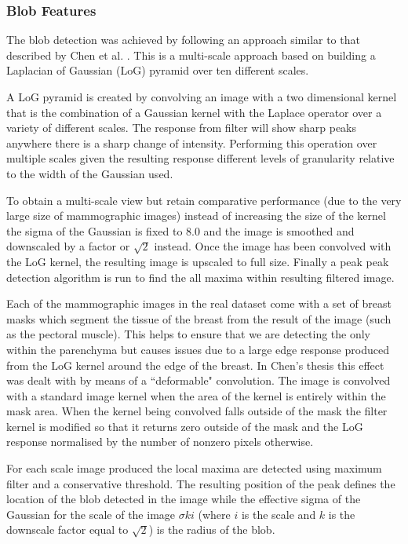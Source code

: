 \subsubsection{Blob Features}
\label{subsubsec:implementation-blob-features}
The blob detection was achieved by following an approach similar to that described by Chen et al. \cite{chen2013multiscale, chen2013mammographic}. This is a multi-scale approach based on building a Laplacian of Gaussian (LoG) pyramid over ten different scales.

A LoG pyramid is created by convolving an image with a two dimensional kernel that is the combination of a Gaussian kernel with the Laplace operator over a variety of different scales. The response from filter will show sharp peaks anywhere there is a sharp change of intensity. Performing this operation over multiple scales given the resulting response different levels of granularity relative to the width of the Gaussian used.

To obtain a multi-scale view but retain comparative performance (due to the very large size of mammographic images) instead of increasing the size of the kernel the sigma of the Gaussian is fixed to 8.0 and the image is smoothed and downscaled by a factor or $\sqrt{2}$ instead. Once the image has been convolved with the LoG kernel, the resulting image is upscaled to full size. Finally a peak peak detection algorithm is run to find the all maxima within resulting filtered image.

Each of the mammographic images in the real dataset come with a set of breast masks which segment the tissue of the breast from the result of the image (such as the pectoral muscle). This helps to ensure that we are detecting the only within the parenchyma but causes issues due to a large edge response produced from the LoG kernel around the edge of the breast. In Chen's thesis this effect was dealt with by means of a ``deformable" convolution. The image is convolved with a standard image kernel when the area of the kernel is entirely within the mask area. When the kernel being convolved falls outside of the mask the filter kernel is modified so that it returns zero outside of the mask and the LoG response normalised by the number of nonzero pixels otherwise.

For each scale image produced the local maxima are detected using maximum filter and a conservative threshold. The resulting position of the peak defines the location of the blob detected in the image while the effective sigma of the Gaussian for the scale of the image $\sigma k i$ (where $i$ is the scale and $k$ is the downscale factor equal to $\sqrt{2}$) is the radius of the blob.

